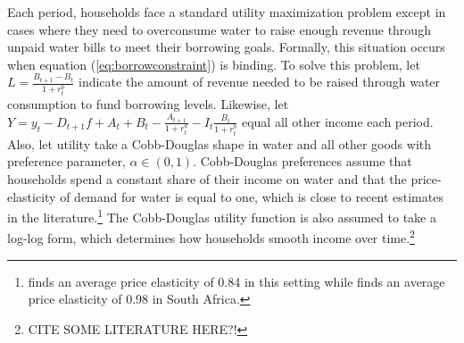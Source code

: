 \documentclass[12pt]{article}
\begin{document}
Each period, households face a standard utility maximization problem except in cases where they need to overconsume water to raise enough revenue through unpaid water bills to meet their borrowing goals.  Formally, this situation occurs when equation (\ref{eq:borrowconstraint}) is binding.  To solve this problem, let $L = \frac{B_{t+1} - B_t }{1+r^{b}_{t}}$ indicate the amount of revenue needed to be raised through water consumption to fund borrowing levels.  Likewise, let $Y = y_t  - D_{t+1} f   +  A_t + B_t  -  \frac{A_{t+1}}{1+r^{a}_{t}} - I_t \frac{B_t}{1+r^{b}_{t}}$ equal all other income each period.  Also, let utility take a Cobb-Douglas shape in water and all other goods with preference parameter, $\alpha \in (0,1)$.  Cobb-Douglas preferences assume that households spend a constant share of their income on water and that the price-elasticity of demand for water is equal to one, which is close to recent estimates in the literature.\footnote{\cite{wjv} finds an average price elasticity of 0.84 in this setting while \cite{szabo2015value} finds an average price elasticity of 0.98 in South Africa.}  The Cobb-Douglas utility function is also assumed to take a log-log form, which determines how households smooth income over time.\footnote{CITE SOME LITERATURE HERE?!}
\end{document}
